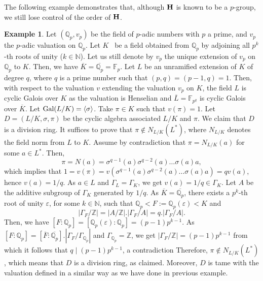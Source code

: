\documentclass{amsart}
\theoremstyle{definition}
\newtheorem{example}{Example}
\numberwithin{equation}{section} %
\begin{document}
The following example demonstrates that, although ${\bf H}$ is known to be a $p$-group, we still lose control of the order of ${\bf H}$. 
\begin{example}\label{example_2}
	Let $(\mathbb{Q}_p,v_p)$ be the field of $p$-adic numbers with $p$ a prime, and $v_p$ the $p$-adic valuation on $\mathbb{Q}_p$. Let $K$  be a field obtained from $\mathbb{Q}_p$ by adjoining all $p^k$-th roots of unity ($k\in\mathbb{N}$). Let us still denote by $v_p$ the unique extension of $v_p$ on $\mathbb{Q}_p$ to $K$. Then, we have $\overline{K}=\overline{\mathbb{Q}_p}=\mathbb{F}_p$. Let $L$ be an unramified extension of $K$ of degree $q$, where $q$ is a prime  number such that $(p,q) =(p-1,q) = 1$. Then, with respect to the valuation $v$ extending the valuation $v_p$ on $K$, the field $L$ is cyclic Galois over $K$ as the valuation is Henselian and $\overline{L}=\mathbb{F}_{p^q}$ is cyclic Galois over $\overline{K}$. Let ${\rm Gal}(L/K)=\langle\sigma\rangle$. Take $\pi\in K$ such that $v(\pi)=1$. Let $D=(L/K, \sigma,\pi)$ be the cyclic algebra associated $L/K$ and $\pi$. We claim that $D$ is a division ring. It suffices to prove that $\pi \notin N_{L/K}(L^*)$, where $N_{L/K}$ denotes the field norm from $L$ to $K$. Assume by contradiction that $\pi = N_{L/K}(a)$ for some $a \in L^*$. Then,
	$$
	\pi = N(a) = \sigma^{q-1}(a)\sigma^{q-2}(a)\ldots\sigma(a)a,
	$$
	which implies that $1=v(\pi)=v\left(\sigma^{q-1}(a)\sigma^{q-2}(a)\ldots\sigma(a)a\right) = qv(a)$, hence $v(a) = 1/q$. As $a\in L$ and $\Gamma_L = \Gamma_K$, we get $v(a)=1/q \in \Gamma_K$.	Let $A$ be the additive subgroup of $\Gamma_K$ generated by $1/q$.  As $\overline{K}=\overline{\mathbb{Q}_p}$, there exists a $p^k$-th root of unity $\varepsilon$, for some $k\in\mathbb{N}$, such that  $\mathbb{Q}_p<F:=\mathbb{Q}_p(\varepsilon)<K$ and
	$$
	|\Gamma_F/\mathbb{Z}| =\left|A/\mathbb{Z}\right| . \left|\Gamma_F/A
	\right|= 
	q . \left|\Gamma_F/A\right|.
	$$
	Then, we have  $[F:\mathbb{Q}_p]=[\mathbb{Q}_p(\varepsilon):\mathbb{Q}_p]=(p-1)p^{k-1}$. As $[F:\mathbb{Q}_p] = [\overline{F}:\overline{\mathbb{Q}_p}].|\Gamma_F/\Gamma_{\mathbb{Q}_p}| $ and $\Gamma_{\mathbb{Q}_p}=\mathbb{Z}$, we get $|\Gamma_F/\mathbb{Z}| = (p-1)p^{k-1}$ from  which it follows that $q\mid (p-1)p^{k-1}$, a contradiction Therefore, $\pi \notin 
	N_{L/K}(L^*)$, which means that $D$ is a division ring, as claimed. Moreover, $D$ is tame with the valuation defined in a similar way as we have done in previous example. 
	

\end{example}
\end{document}
